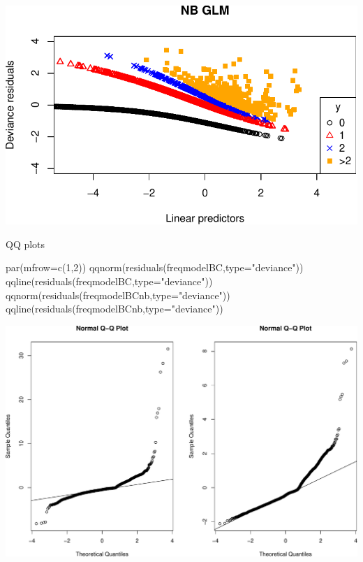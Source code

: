\documentclass[
  ignorenonframetext,
]{beamer}
\newenvironment{Shaded}{\begin{snugshade}}{\end{snugshade}}
\newcommand{\AttributeTok}[1]{\textcolor[rgb]{0.77,0.63,0.00}{#1}}
\newcommand{\DecValTok}[1]{\textcolor[rgb]{0.00,0.00,0.81}{#1}}
\newcommand{\FunctionTok}[1]{\textcolor[rgb]{0.00,0.00,0.00}{#1}}
\newcommand{\NormalTok}[1]{#1}
\newcommand{\StringTok}[1]{\textcolor[rgb]{0.31,0.60,0.02}{#1}}
\begin{document}
\begin{frame}{}
\protect\hypertarget{section-5}{}
\includegraphics{week8_p1_files/figure-beamer/unnamed-chunk-9-1.pdf}
\end{frame}

\begin{frame}[fragile]{QQ plots}
\protect\hypertarget{qq-plots}{}
\scriptsize

\begin{Shaded}
\begin{Highlighting}[]
\FunctionTok{par}\NormalTok{(}\AttributeTok{mfrow=}\FunctionTok{c}\NormalTok{(}\DecValTok{1}\NormalTok{,}\DecValTok{2}\NormalTok{))}
\FunctionTok{qqnorm}\NormalTok{(}\FunctionTok{residuals}\NormalTok{(freqmodelBC,}\AttributeTok{type=}\StringTok{"deviance"}\NormalTok{))}
\FunctionTok{qqline}\NormalTok{(}\FunctionTok{residuals}\NormalTok{(freqmodelBC,}\AttributeTok{type=}\StringTok{"deviance"}\NormalTok{))}
\FunctionTok{qqnorm}\NormalTok{(}\FunctionTok{residuals}\NormalTok{(freqmodelBCnb,}\AttributeTok{type=}\StringTok{"deviance"}\NormalTok{))}
\FunctionTok{qqline}\NormalTok{(}\FunctionTok{residuals}\NormalTok{(freqmodelBCnb,}\AttributeTok{type=}\StringTok{"deviance"}\NormalTok{))}
\end{Highlighting}
\end{Shaded}

\includegraphics{week8_p1_files/figure-beamer/unnamed-chunk-10-1.pdf}
\end{frame}
\end{document}
